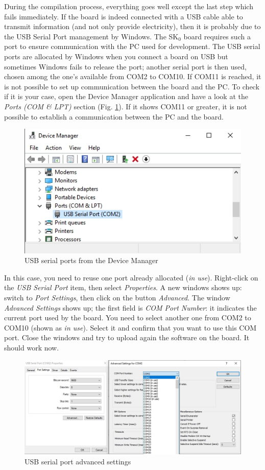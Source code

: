 During the compilation process, everything goes well except the last step which fails immediately. If the board is indeed connected with a USB cable able to transmit information (and not only provide electricity), then it is probably due to the USB Serial Port management by Windows. The SK$_0$ board requires such a port to ensure communication with the PC used for development. The USB serial ports are allocated by Windows when you connect a board on USB but sometimes Windows fails to release the port; another serial port is then used, chosen among the one's available from COM2 to COM10. If COM11 is reached, it is not possible to set up communication between the board and the PC. To check if it is your case, open the Device Manager application and have a look at the \textit{Ports (COM \& LPT)} section (Fig. \ref{annexes:peripherals}). If it shows COM11 or greater, it is not possible to establish a communication between the PC and the board.

\begin{figure}[h]
\centering\includegraphics[scale=0.5]{Pictures/peripherals.jpg}
\caption{USB serial ports from the Device Manager}
\label{annexes:peripherals}
\end{figure}

In this case, you need to reuse one port already allocated (\textit{in use}). Right-click on the \textit{USB Serial Port} item, then select \textit{Properties}. A new windows shows up: switch to \textit{Port Settings}, then click on the button \textit{Advanced}. The window \textit{Advanced Settings} shows up; the first field is \textit{COM Port Number}: it indicates the current port used by the board. You need to select another one from COM2 to COM10 (shown as \textit{in use}). Select it and confirm that you want to use this COM port. Close the windows and try to upload again the software on the board. It should work now.

\begin{figure}[h]
\centering\includegraphics[scale=0.4]{Pictures/usb params.jpg}
\caption{USB serial port advanced settings}
\label{annexes:usb-params}
\end{figure}